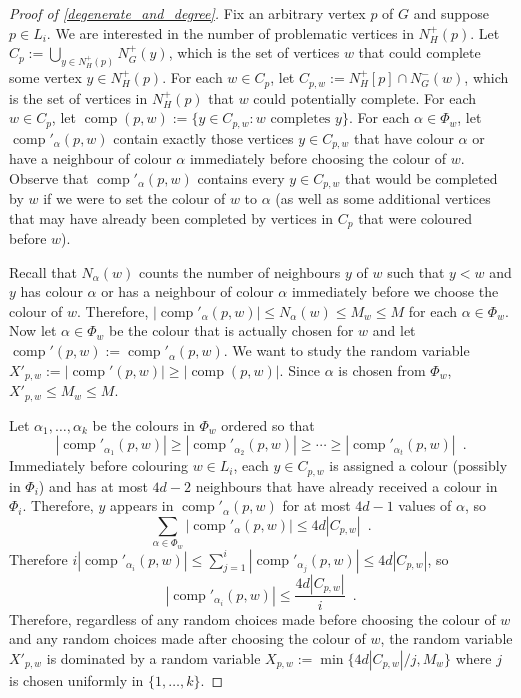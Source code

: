 \documentclass{patmorin}
\DeclareMathOperator{\comp}{comp}
\begin{document}
\begin{proof}[Proof of \cref{degenerate_and_degree}]
  Fix an arbitrary vertex $p$ of $G$ and suppose $p\in L_i$. We are interested in the number of problematic vertices in $N_H^+(p)$.  Let $C_p:=\bigcup_{y\in N^+_H(p)} N^+_G(y)$, which is the set of vertices $w$ that could complete some vertex $y\in N^+_H(p)$. For each $w\in C_p$, let
  $C_{p,w}:=N_H^+[p]\cap N_G^-(w)$, which is the set of vertices in $N^+_{H}(p)$ that $w$ could potentially complete. For each $w\in C_p$, let $\comp(p,w):=\{y\in C_{p,w}:\text{$w$ completes $y$}\}$.  For each $\alpha\in\Phi_w$, let $\comp'_\alpha(p,w)$ contain exactly those vertices $y\in C_{p,w}$ that have colour $\alpha$ or have a neighbour of colour $\alpha$ immediately before choosing the colour of $w$.  Observe that $\comp'_\alpha(p,w)$ contains every $y\in C_{p,w}$ that would be completed by $w$ if we were to set the colour of $w$ to $\alpha$ (as well as some additional vertices that may have already been completed by vertices in $C_p$ that were coloured before $w$).

  Recall that $N_\alpha(w)$ counts the number of neighbours $y$ of $w$ such that $y < w$ and $y$ has colour $\alpha$ or has a neighbour of colour $\alpha$ immediately before we choose the colour of $w$.  Therefore,  $|\comp'_\alpha(p,w)|\le N_\alpha(w)\le M_w\le M$ for each $\alpha\in\Phi_w$.  Now let $\alpha\in\Phi_w$ be the colour that is actually chosen for $w$ and let $\comp'(p,w):=\comp'_\alpha(p,w)$.  We want to study the random variable $X'_{p,w}:=|\comp'(p,w)|\ge |\comp(p,w)|$.  Since $\alpha$ is chosen from $\Phi_w$, $X'_{p,w}\le M_w\le M$.

  Let $\alpha_1,\ldots,\alpha_k$ be the colours in $\Phi_w$ ordered so that
  \[
    |\comp'_{\alpha_1}(p,w)|\ge|\comp'_{\alpha_2}(p,w)|\ge\cdots\ge |\comp'_{\alpha_t}(p,w)| \enspace .
  \]
  Immediately before colouring $w\in L_i$, each $y\in C_{p,w}$ is assigned a colour (possibly in $\Phi_i$) and has at most $4d-2$ neighbours that have already received a colour in $\Phi_i$.  Therefore, $y$ appears in
  $\comp'_{\alpha}(p,w)$ for at most $4d-1$ values of $\alpha$, so
  \[
    \sum_{\alpha\in\Phi_w} |\comp'_{\alpha}(p,w)| \le 4d| C_{p,w}| \enspace .
  \]
  Therefore $i|\comp'_{\alpha_i}(p,w)|\le\sum_{j=1}^i|\comp'_{\alpha_j}(p,w)|\le 4d|C_{p,w}|$, so
  \[
    |\comp'_{\alpha_i}(p,w)|\le \frac{4d|C_{p,w}|}{i} \enspace .
  \]
  Therefore, regardless of any random choices made before choosing the colour of $w$ and any random choices made after choosing the colour of $w$, the random variable $X'_{p,w}$ is dominated by a random variable $X_{p,w}:=\min\{4d|C_{p,w}|/j,M_w\}$ where $j$ is chosen uniformly in $\{1,\ldots,k\}$.


\end{proof}
\end{document}

